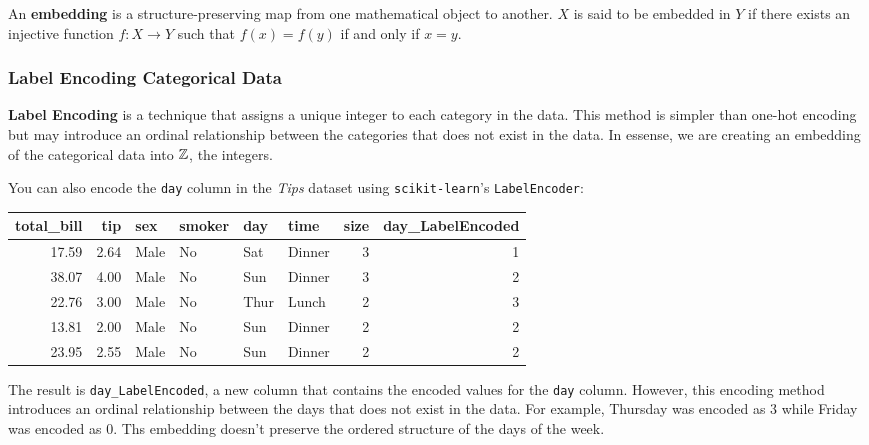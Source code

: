 \begin{definition}
    An \textbf{embedding} is a structure-preserving map from one mathematical object to another. $X$ is said to be embedded in $Y$ if there exists an injective function $f:X\to Y$ such that $f(x)=f(y)$ if and only if $x=y$. 
\end{definition}

\subsubsection{Label Encoding Categorical Data}

\textbf{Label Encoding} is a technique that assigns a unique integer to each category in the data. This method is simpler than one-hot encoding but may introduce an ordinal relationship between the categories that does not exist in the data. In essense, we are creating an embedding of the categorical data into $\mathbb{Z}$, the integers.

You can also encode the \texttt{day} column in the \emph{Tips} dataset using \texttt{scikit-learn}'s \texttt{LabelEncoder}:


\begin{table}[ht]
    \centering 
    \begin{tabular}{rrllllrr}
        \toprule
        total\_bill & tip & sex & smoker & day & time & size & day\_LabelEncoded \\
        \midrule
        17.59 & 2.64 & Male & No & Sat & Dinner & 3 & 1 \\
        38.07 & 4.00 & Male & No & Sun & Dinner & 3 & 2 \\
        22.76 & 3.00 & Male & No & Thur & Lunch & 2 & 3 \\
        13.81 & 2.00 & Male & No & Sun & Dinner & 2 & 2 \\
        23.95 & 2.55 & Male & No & Sun & Dinner & 2 & 2 \\
        \bottomrule
    \end{tabular}               
\end{table}

The result is \texttt{day\_LabelEncoded}, a new column that contains the encoded values for the \texttt{day} column. However, this encoding method introduces an ordinal relationship between the days that does not exist in the data. For example, Thursday was encoded as $3$ while Friday was encoded as $0$. Ths embedding doesn't preserve the ordered structure of the days of the week.


